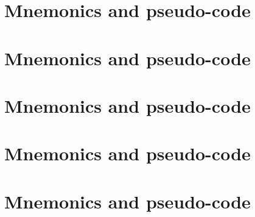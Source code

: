 \documentclass[preprint]{iacrtrans}
\begin{document}





\appendix

\section{ Mnemonics and pseudo-code}
\label{sec:pseudo:v1}


\newpage
\section{ Mnemonics and pseudo-code}
\label{sec:pseudo:v2}


\newpage
\section{ Mnemonics and pseudo-code}
\label{sec:pseudo:v3}


\newpage
\section{ Mnemonics and pseudo-code}
\label{sec:pseudo:v4}


\newpage
\section{ Mnemonics and pseudo-code}
\label{sec:pseudo:v5}


\end{document}
